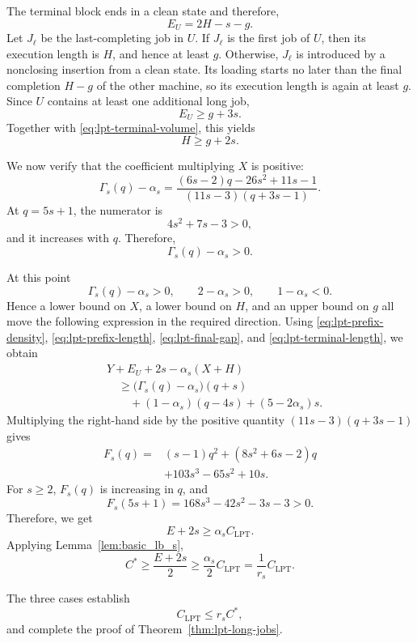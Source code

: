 \documentclass[11pt]{article}
\begin{document}
The terminal block ends in a clean state and therefore,
\[
E_U=2H-s-g.
\tag{A.22}
\label{eq:lpt-terminal-volume}
\]
Let \(J_\ell\) be the last-completing job in \(U\). If \(J_\ell\) is the
first job of \(U\), then its execution length is \(H\), and hence at least
\(g\). Otherwise, \(J_\ell\) is introduced by a nonclosing insertion from a
clean state. Its loading starts no later than the final completion \(H-g\) of
the other machine, so its execution length is again at least \(g\). Since
\(U\) contains at least one additional long job,
\[
E_U\ge g+3s.
\]
Together with \eqref{eq:lpt-terminal-volume}, this yields
\[
H\ge g+2s.
\tag{A.23}
\label{eq:lpt-terminal-length}
\]

We now verify that the coefficient multiplying \(X\) is positive:
\[
\Gamma_s(q)-\alpha_s
=
\frac{(6s-2)q-26s^2+11s-1}
     {(11s-3)(q+3s-1)}.
\tag{A.24}
\label{eq:lpt-gamma-positive}
\]
At \(q=5s+1\), the numerator is
\[
4s^2+7s-3>0,
\]
and it increases with \(q\). Therefore, 
\[
\Gamma_s(q)-\alpha_s>0.
\]

At this point
\[
\Gamma_s(q)-\alpha_s>0,
\qquad 2-\alpha_s>0,
\qquad 1-\alpha_s<0.
\]
Hence a lower bound on \(X\), a lower bound on \(H\), and an upper bound on
\(g\) all move the following expression in the required direction. Using
\eqref{eq:lpt-prefix-density}, \eqref{eq:lpt-prefix-length},
\eqref{eq:lpt-final-gap}, and \eqref{eq:lpt-terminal-length}, we obtain
\[
\begin{aligned}
&Y+E_U+2s-\alpha_s(X+H)\\
&\quad\ge
\bigl(\Gamma_s(q)-\alpha_s\bigr)(q+s)\\
&\qquad
+(1-\alpha_s)(q-4s)
+(5-2\alpha_s)s.
\end{aligned}
\tag{A.25}
\label{eq:lpt-final-surplus}
\]
Multiplying the right-hand side by the positive quantity
\((11s-3)(q+3s-1)\) gives
\[
\begin{aligned}
F_s(q)
={}&(s-1)q^2
 +(8s^2+6s-2)q\\
&+103s^3-65s^2+10s.
\end{aligned}
\]
For \(s\ge2\), \(F_s(q)\) is increasing in \(q\), and
\[
F_s(5s+1)
=
168s^3-42s^2-3s-3
>0.
\]
Therefore, we get 
\[
E+2s\ge\alpha_sC_{\mathrm{LPT}}.
\]
Applying Lemma~\ref{lem:basic_lb_s},
\[
C^*
\ge
\frac{E+2s}{2}
\ge
\frac{\alpha_s}{2}C_{\mathrm{LPT}}
=
\frac1{r_s}C_{\mathrm{LPT}}.
\]

The three cases establish
\[
C_{\mathrm{LPT}}\le r_sC^*,
\]
and complete the proof of Theorem~\ref{thm:lpt-long-jobs}.
\end{document}
